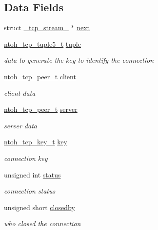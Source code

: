\subsection*{Data Fields}
\begin{DoxyCompactItemize}
\item 
struct \hyperlink{struct__tcp__stream__}{\-\_\-tcp\-\_\-stream\-\_\-} $\ast$ \hyperlink{struct__tcp__stream___a7c78f69b0b17c301d5efac15fdf52e8f}{next}
\item 
\hyperlink{structntoh__tcp__tuple5__t}{ntoh\-\_\-tcp\-\_\-tuple5\-\_\-t} \hyperlink{struct__tcp__stream___ace3ecfe5f3174bb45bbead89efe846de}{tuple}
\begin{DoxyCompactList}\small\item\em data to generate the key to identify the connection \end{DoxyCompactList}\item 
\hyperlink{structntoh__tcp__peer__t}{ntoh\-\_\-tcp\-\_\-peer\-\_\-t} \hyperlink{struct__tcp__stream___a1a9f72c5f58a3583f2a54d176e51de0c}{client}
\begin{DoxyCompactList}\small\item\em client data \end{DoxyCompactList}\item 
\hyperlink{structntoh__tcp__peer__t}{ntoh\-\_\-tcp\-\_\-peer\-\_\-t} \hyperlink{struct__tcp__stream___a20b10dfca977ef001517383d7b5e7ad2}{server}
\begin{DoxyCompactList}\small\item\em server data \end{DoxyCompactList}\item 
\hyperlink{tcpreassembly_8h_aa3f9c3d7e8a394f8b2f6329d8f5a8567}{ntoh\-\_\-tcp\-\_\-key\-\_\-t} \hyperlink{struct__tcp__stream___a3e73dbd870716a9514647123a271c681}{key}
\begin{DoxyCompactList}\small\item\em connection key \end{DoxyCompactList}\item 
unsigned int \hyperlink{struct__tcp__stream___aeed08ea57af6f7be240e2bf66162389f}{status}
\begin{DoxyCompactList}\small\item\em connection status \end{DoxyCompactList}\item 
unsigned short \hyperlink{struct__tcp__stream___a6007459c2b9e0960b841fe8fd596b001}{closedby}
\begin{DoxyCompactList}\small\item\em who closed the connection \end{DoxyCompactList}\item 

\end{DoxyCompactItemize}

